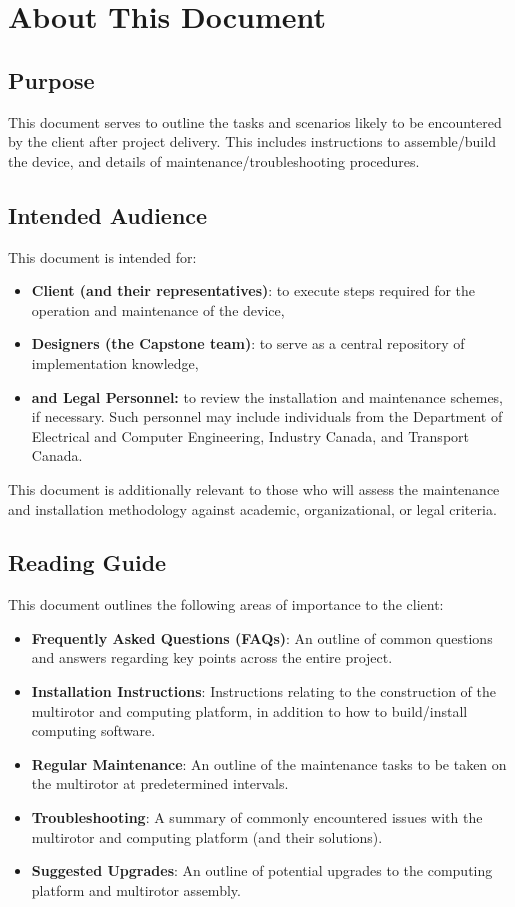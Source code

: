 \documentclass[10pt,letterpaper]{article}
\begin{document}


\section{About This Document}

\subsection{Purpose}
This document serves to outline the tasks and scenarios likely to be encountered by the client after project delivery. This includes instructions to assemble/build the device, and details of maintenance/troubleshooting procedures. 

\subsection{Intended Audience}
This document is intended for:
\begin{itemize}
\item \textbf{Client (and their representatives)}: to execute steps required for the operation and maintenance of the device,
\item \textbf{Designers (the Capstone team)}: to serve as a central repository of implementation knowledge,
\item \textbf{and Legal Personnel:} to review the installation and maintenance schemes, if necessary. Such personnel may include individuals from the Department of Electrical and Computer Engineering, Industry Canada, and Transport Canada.
\end{itemize}

This document is additionally relevant to those who will assess the maintenance and installation methodology against academic, organizational, or legal criteria.

\subsection{Reading Guide}
This document outlines the following areas of importance to the client: 

\begin{itemize}
\item \textbf{Frequently Asked Questions (FAQs)}: An outline of common questions and answers regarding key points across the entire project.
\item \textbf{Installation Instructions}: Instructions relating to the construction of the multirotor and computing platform, in addition to how to build/install computing software.
\item \textbf{Regular Maintenance}: An outline of the maintenance tasks to be taken on the multirotor at predetermined intervals.
\item \textbf{Troubleshooting}: A summary of commonly encountered issues with the multirotor and computing platform (and their solutions).
\item \textbf{Suggested Upgrades}: An outline of potential upgrades to the computing platform and multirotor assembly.
\end{itemize}
\end{document}
